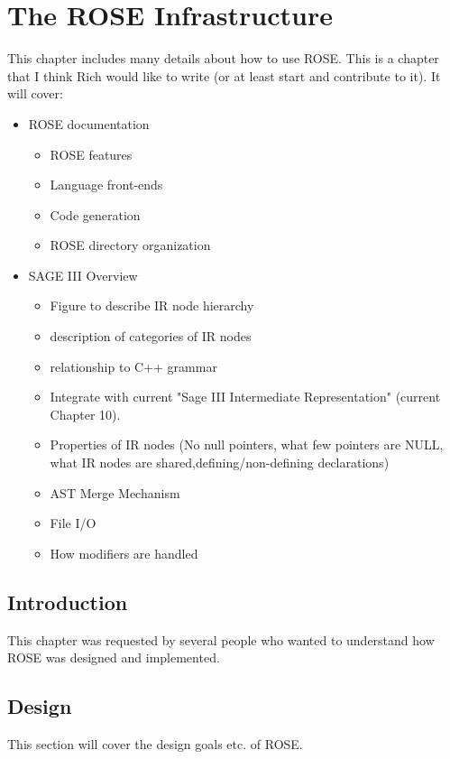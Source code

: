 \chapter{The ROSE Infrastructure}

\label{overviewOfRose:overviewOfRose}


This chapter includes many details about how to
use ROSE. This is a chapter that I think Rich would like to write
(or at least start and contribute to it).  It will cover:
\begin{itemize}
   \item ROSE documentation
   \begin{itemize}
      \item ROSE features
      \item Language front-ends
      \item Code generation
      \item ROSE directory organization
   \end{itemize}
   \item SAGE III Overview
   \begin{itemize}
      \item Figure to describe IR node hierarchy
      \item description of categories of IR nodes
      \item relationship to C++ grammar
      \item Integrate with current "Sage III Intermediate Representation" (current Chapter 10).
      \item Properties of IR nodes (No null pointers, what few pointers are NULL, what IR nodes are shared,defining/non-defining declarations)
      \item AST Merge Mechanism
      \item File I/O
      \item How modifiers are handled
   \end{itemize}
\end{itemize}


\section{Introduction}
     This chapter was requested by several people who wanted to understand 
how ROSE was designed and implemented.

\section{Design}
     This section will cover the design goals etc. of ROSE.

